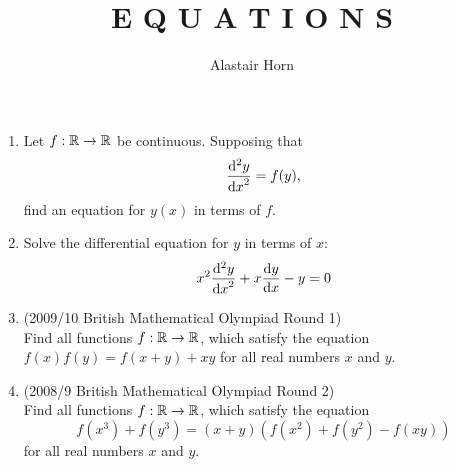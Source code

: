 \documentclass[a4paper,12pt,fleqn]{article}
\author{Alastair Horn}
\title{E Q U A T I O N S}
\begin{document}
\maketitle

\begin{enumerate}
 \item
  Let \(f: \mathbb R \to \mathbb R\) be continuous. Supposing that
  \begin{equation*}
   \dv[2]<y>{x} = f(y),
  \end{equation*}
  find an equation for \(y(x)\) in terms of \(f\).
 \item Solve the differential equation for \(y\) in terms of \(x\):
  \begin{equation*}
      x^2\dv[2]<y>{x} + x\dv<y>{x} - y = 0
  \end{equation*}
 \item (2009/10 British Mathematical Olympiad Round 1) \\
  Find all functions \(f: \mathbb R \to \mathbb R\), which satisfy the equation
  \(f(x)f(y) = f(x + y) + xy\) for all real numbers \(x\) and \(y\).
 \item (2008/9 British Mathematical Olympiad Round 2) \\
  Find all functions \(f: \mathbb R \to \mathbb R\), which satisfy the equation
  \[f(x^3) + f(y^3) = (x + y)(f(x^2) + f(y^2) - f(xy))\] for all real numbers
  \(x\) and \(y\).

\end{enumerate}
\end{document}
